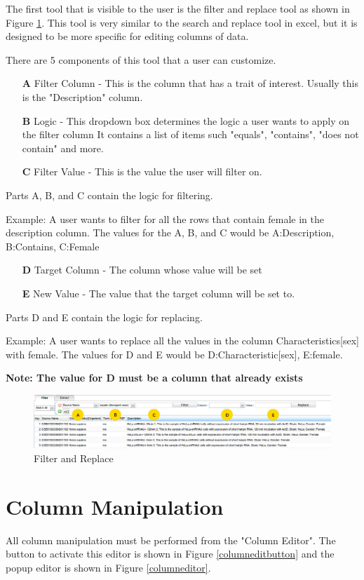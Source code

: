 \documentclass[a4paper]{article}
\begin{document}
The first tool that is visible to the user is the filter and replace tool as shown in Figure \ref{filterandreplace}. This tool is very similar to the search and replace tool in excel, but it is designed to be more specific for editing columns of data.

There are 5 components of this tool that a user can customize.
\begin{enumerate}
\item[\bf{A}] Filter Column - This is the column that has a trait of interest. Usually this is the "Description" column.
\item[\bf{B}] Logic - This dropdown box determines the logic a user wants to apply on the filter column It contains a list of items such "equals", "contains", "does not contain" and more.
\item[\bf{C}] Filter Value - This is the value the user will filter on.
\end{enumerate}
Parts A, B, and C contain the logic for filtering. 

Example: A user wants to filter for all the rows that contain female in the description column. The values for the A, B, and C would be A:Description, B:Contains, C:Female

\begin{enumerate}
\item[\bf{D}] Target Column - The column whose value will be set
\item[\bf{E}] New Value - The value that the target column will be set to.
\end{enumerate}
Parts D and E contain the logic for replacing.

Example: A user wants to replace all the values in the column Characteristics[sex] with female. The values for D and E would be D:Characteristic[sex], E:female.

\bf{Note: The value for D must be a column that already exists}\rm

\begin{figure}[h]
\caption{Filter and Replace}
\centering
\label{filterandreplace}
\includegraphics[width=17cm]{images/Filter}
\end{figure}
\section{Column Manipulation}
All column manipulation must be performed from the "Column Editor". The button to activate this editor is shown in Figure \ref{columneditbutton} and the popup editor is shown in Figure \ref{columneditor}. 
\end{document}

